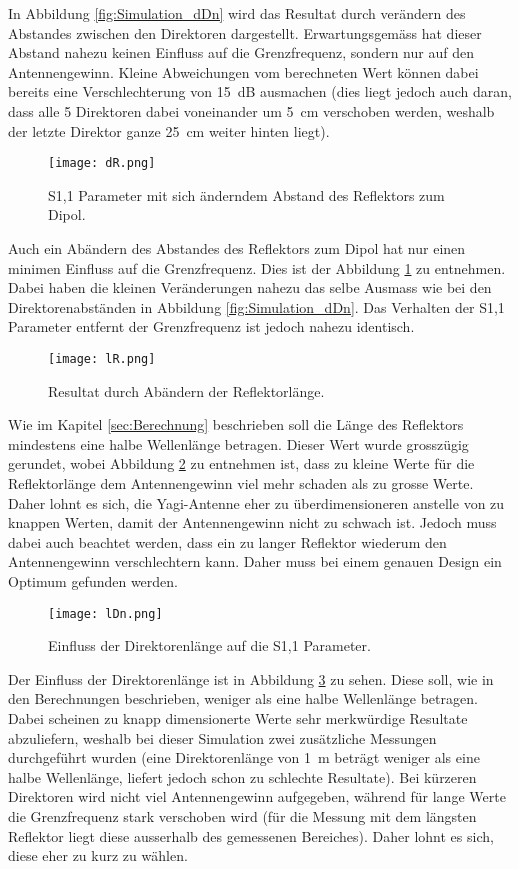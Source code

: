 In Abbildung \ref{fig:Simulation_dDn} wird das Resultat durch verändern des Abstandes zwischen den Direktoren dargestellt. Erwartungsgemäss hat dieser Abstand nahezu keinen Einfluss auf die Grenzfrequenz, sondern nur auf den Antennengewinn. Kleine Abweichungen vom berechneten Wert können dabei bereits eine Verschlechterung von \SI{15}{dB} ausmachen (dies liegt jedoch auch daran, dass alle 5 Direktoren dabei voneinander um \SI{5}{cm} verschoben werden, weshalb der letzte Direktor ganze \SI{25}{cm} weiter hinten liegt).

\begin{figure}[h!]
	\centering
	\texttt{[image: dR.png]}
	\caption{S1,1 Parameter mit sich änderndem Abstand des Reflektors zum Dipol.}
	\label{fig:Simulation_dR}
\end{figure}

Auch ein Abändern des Abstandes des Reflektors zum Dipol hat nur einen minimen Einfluss auf die Grenzfrequenz. Dies ist der Abbildung \ref{fig:Simulation_dR} zu entnehmen. Dabei haben die kleinen Veränderungen nahezu das selbe Ausmass wie bei den Direktorenabständen in Abbildung \ref{fig:Simulation_dDn}. Das Verhalten der S1,1 Parameter entfernt der Grenzfrequenz ist jedoch nahezu identisch.

\begin{figure}[h!]
	\centering
	\texttt{[image: lR.png]}
	\caption{Resultat durch Abändern der Reflektorlänge.}
	\label{fig:Simulation_lR}
\end{figure}

Wie im Kapitel \ref{sec:Berechnung} beschrieben soll die Länge des Reflektors mindestens eine halbe Wellenlänge betragen. Dieser Wert wurde grosszügig gerundet, wobei Abbildung \ref{fig:Simulation_lR} zu entnehmen ist, dass zu kleine Werte für die Reflektorlänge dem Antennengewinn viel mehr schaden als zu grosse Werte. Daher lohnt es sich, die Yagi-Antenne eher zu überdimensioneren anstelle von zu knappen Werten, damit der Antennengewinn nicht zu schwach ist. Jedoch muss dabei auch beachtet werden, dass ein zu langer Reflektor wiederum den Antennengewinn verschlechtern kann. Daher muss bei einem genauen Design ein Optimum gefunden werden.

\begin{figure}[h!]
	\centering
	\texttt{[image: lDn.png]}
	\caption{Einfluss der Direktorenlänge auf die S1,1 Parameter.}
	\label{fig:Simulation_lDn}
\end{figure}

Der Einfluss der Direktorenlänge ist in Abbildung \ref{fig:Simulation_lDn} zu sehen. Diese soll, wie in den Berechnungen beschrieben, weniger als eine halbe Wellenlänge betragen. Dabei scheinen zu knapp dimensionerte Werte sehr merkwürdige Resultate abzuliefern, weshalb bei dieser Simulation zwei zusätzliche Messungen durchgeführt wurden (eine Direktorenlänge von \SI{1}{m} beträgt weniger als eine halbe Wellenlänge, liefert jedoch schon zu schlechte Resultate). Bei kürzeren Direktoren wird nicht viel Antennengewinn aufgegeben, während für lange Werte die Grenzfrequenz stark verschoben wird (für die Messung mit dem längsten Reflektor liegt diese ausserhalb des gemessenen Bereiches). Daher lohnt es sich, diese eher zu kurz zu wählen.

